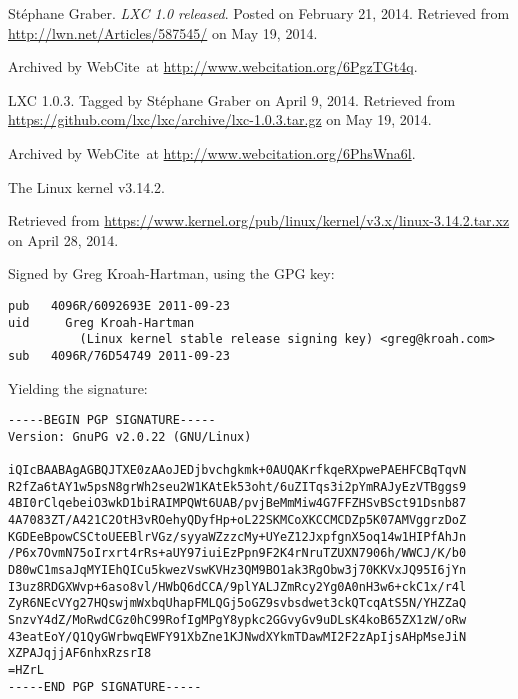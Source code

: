 \begin{thebibliography}{9}
Stéphane Graber. \emph{LXC 1.0 released}. Posted on February 21, 2014.
Retrieved from \url{http://lwn.net/Articles/587545/} on May 19, 2014.

Archived by WebCite\textsuperscript{\textregistered}\ at
\url{http://www.webcitation.org/6PgzTGt4q}.


LXC 1.0.3. Tagged by Stéphane Graber on April 9, 2014. Retrieved from
\url{https://github.com/lxc/lxc/archive/lxc-1.0.3.tar.gz} on May 19, 2014.

Archived by WebCite\textsuperscript{\textregistered}\ at
\url{http://www.webcitation.org/6PhsWna6l}.


The Linux kernel v3.14.2.

Retrieved from
\url{https://www.kernel.org/pub/linux/kernel/v3.x/linux-3.14.2.tar.xz} on April
28, 2014.

Signed by Greg Kroah-Hartman, using the GPG key:

\begin{lstlisting}
pub   4096R/6092693E 2011-09-23
uid     Greg Kroah-Hartman
          (Linux kernel stable release signing key) <greg@kroah.com>
sub   4096R/76D54749 2011-09-23
\end{lstlisting}

Yielding the signature:

\begin{lstlisting}
-----BEGIN PGP SIGNATURE-----
Version: GnuPG v2.0.22 (GNU/Linux)

iQIcBAABAgAGBQJTXE0zAAoJEDjbvchgkmk+0AUQAKrfkqeRXpwePAEHFCBqTqvN
R2fZa6tAY1w5psN8grWh2seu2W1KAtEk53oht/6uZITqs3i2pYmRAJyEzVTBggs9
4BI0rClqebeiO3wkD1biRAIMPQWt6UAB/pvjBeMmMiw4G7FFZHSvBSct91Dsnb87
4A7083ZT/A421C2OtH3vROehyQDyfHp+oL22SKMCoXKCCMCDZp5K07AMVggrzDoZ
KGDEeBpowCSCtoUEEBlrVGz/syyaWZzzcMy+UYeZ12JxpfgnX5oq14w1HIPfAhJn
/P6x7OvmN75oIrxrt4rRs+aUY97iuiEzPpn9F2K4rNruTZUXN7906h/WWCJ/K/b0
D80wC1msaJqMYIEhQICu5kwezVswKVHz3QM9BO1ak3RgObw3j70KKVxJQ95I6jYn
I3uz8RDGXWvp+6aso8vl/HWbQ6dCCA/9plYALJZmRcy2Yg0A0nH3w6+ckC1x/r4l
ZyR6NEcVYg27HQswjmWxbqUhapFMLQGj5oGZ9svbsdwet3ckQTcqAtS5N/YHZZaQ
SnzvY4dZ/MoRwdCGz0hC99RofIgMPgY8ypkc2GGvyGv9uDLsK4koB65ZX1zW/oRw
43eatEoY/Q1QyGWrbwqEWFY91XbZne1KJNwdXYkmTDawMI2F2zApIjsAHpMseJiN
XZPAJqjjAF6nhxRzsrI8
=HZrL
-----END PGP SIGNATURE-----
\end{lstlisting}



\end{thebibliography}
